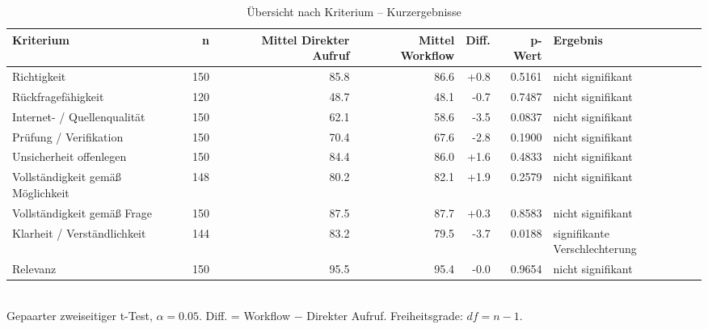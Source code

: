 \begin{table}[htbp]
\centering
\caption{Übersicht nach Kriterium -- Kurzergebnisse}
\begin{tabular}{lrrrrrl}
\toprule
Kriterium & n & Mittel Direkter Aufruf & Mittel Workflow & Diff. & p-Wert & Ergebnis \\
\midrule
Richtigkeit & 150 & 85.8 & 86.6 & +0.8 & 0.5161 & nicht signifikant \\
Rückfragefähigkeit & 120 & 48.7 & 48.1 & -0.7 & 0.7487 & nicht signifikant \\
Internet- / Quellenqualität & 150 & 62.1 & 58.6 & -3.5 & 0.0837 & nicht signifikant \\
Prüfung / Verifikation & 150 & 70.4 & 67.6 & -2.8 & 0.1900 & nicht signifikant \\
Unsicherheit offenlegen & 150 & 84.4 & 86.0 & +1.6 & 0.4833 & nicht signifikant \\
Vollständigkeit gemäß Möglichkeit & 148 & 80.2 & 82.1 & +1.9 & 0.2579 & nicht signifikant \\
Vollständigkeit gemäß Frage & 150 & 87.5 & 87.7 & +0.3 & 0.8583 & nicht signifikant \\
Klarheit / Verständlichkeit & 144 & 83.2 & 79.5 & -3.7 & 0.0188 & signifikante Verschlechterung \\
Relevanz & 150 & 95.5 & 95.4 & -0.0 & 0.9654 & nicht signifikant \\
\bottomrule
\end{tabular}
\\[2mm]
\footnotesize Gepaarter zweiseitiger t-Test, $\alpha=0.05$. Diff. = Workflow $-$ Direkter Aufruf. Freiheitsgrade: $df=n-1$.
\end{table}

